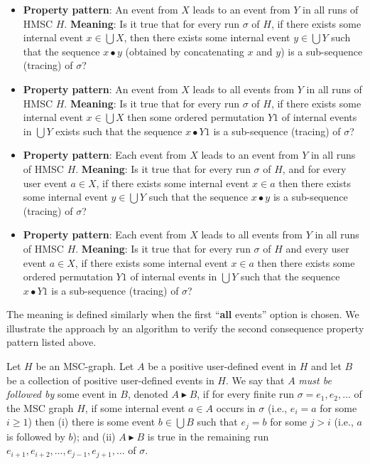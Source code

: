 \documentclass{entcs}
\begin{document}
\begin{itemize}
\item {\bf {Property pattern}}: An event from $X$ 
leads to an event from $Y$ in all runs of HMSC $H$. 
{\bf {Meaning}}: Is it true that for every run $\sigma$ 
of $H$, if there exists some internal event $x \in \bigcup X$, 
then there exists some internal event $y \in \bigcup Y$ 
such that the sequence $x \bullet y$ (obtained by 
concatenating $x$ and $y$) is a sub-sequence 
(tracing) of $\sigma$? 
\item {\bf {Property pattern}}: An event from $X$ leads 
to all events from $Y$ in all runs of HMSC $H$. 
{\bf {Meaning}}: Is it true that for every run $\sigma$ 
of $H$, if there exists some internal event $x \in \bigcup X$ 
then some ordered permutation $Y1$ of internal events 
in $\bigcup Y$ exists such that the sequence $x \bullet Y1$ is a 
sub-sequence (tracing) of $\sigma$?
\item {\bf {Property pattern}}: Each event from $X$ 
leads to an event from $Y$ in all runs of HMSC $H$. 
{\bf {Meaning}}: Is it true that for every run $\sigma$ 
of $H$, and for every user event $a \in X$, if there exists 
some internal event $x \in a$ then there exists some 
internal event $y \in \bigcup Y$ such that the sequence 
$x \bullet y$ is a sub-sequence (tracing) of $\sigma$?
\item {\bf {Property pattern}}: Each event from $X$ 
leads to all events from $Y$ in all runs of HMSC $H$. 
{\bf {Meaning}}: Is it true that for every run 
$\sigma$ of $H$ and every user event $a \in X$, if there 
exists some internal event $x \in a$ then there exists some ordered 
permutation $Y1$ of internal events in $\bigcup Y$ such that 
the sequence $x \bullet Y1$ is a sub-sequence 
(tracing) of $\sigma$?
\end{itemize}

The meaning is defined similarly when the first 
``{\bf {all}} events'' option is chosen. We illustrate 
the approach by an algorithm to verify the second consequence 
property pattern listed above.

\begin{definition}
\label{mustfollowed}
Let $H$ be an MSC-graph. Let $A$ be a positive user-defined 
event in $H$ and let $B$ be a collection of positive 
user-defined events in $H$. We say that $A$ \emph{must be 
followed by} some event in $B$, denoted 
$A \blacktriangleright B$, if for every finite run 
$\sigma = e_1,e_2,\ldots$ of the MSC graph $H$, if some 
internal event $a \in A$ occurs in $\sigma$ (i.e., $e_i = a$ 
for some $i \geq 1$) then (i) there is some event 
$b \in \bigcup B$ such that $e_j = b$ for some $j > i$ 
(i.e., $a$ is followed by $b$); and (ii) 
$A \blacktriangleright B$ is true in the remaining run 
$e_{i+1},e_{i+2},\ldots,e_{j-1},e_{j+1},\ldots$ of $\sigma$.
\end{definition}
\end{document}
